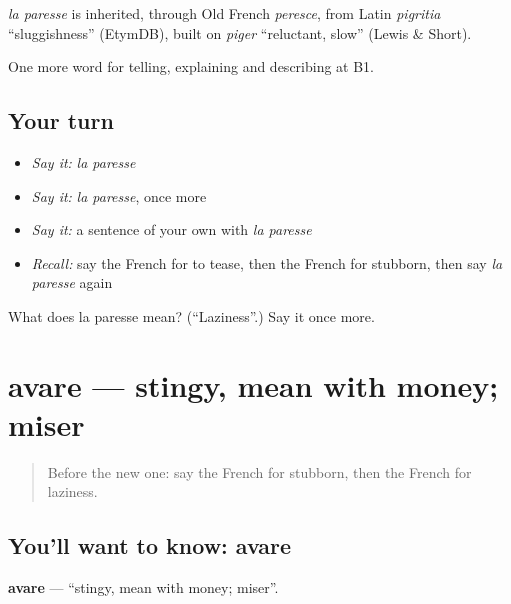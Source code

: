 \begin{cousinweb}
\emph{la paresse} is inherited, through Old French \emph{peresce}, from Latin \emph{pigritia} \textquotedblleft{}sluggishness\textquotedblright{} (EtymDB), built on \emph{piger} \textquotedblleft{}reluctant, slow\textquotedblright{} (Lewis \& Short).
\end{cousinweb}

\begin{grammarlens}[title={What you've built}]
One more word for telling, explaining and describing at B1.
\end{grammarlens}

\subsection*{Your turn}
\begin{itemize}
\raggedright
  \item \emph{Say it:} \emph{la paresse}
  \item \emph{Say it:} \emph{la paresse}, once more
  \item \emph{Say it:} a sentence of your own with \emph{la paresse}
  \item \emph{Recall:} say the French for to tease, then the French for stubborn, then say \emph{la paresse} again
\end{itemize}

\begin{tcolorbox}[breakable,colback=teal!4,colframe=teal!35!black,title={Before you move on}]
What does la paresse mean? (\textquotedblleft{}Laziness\textquotedblright{}.) Say it once more.
\end{tcolorbox}
\section[avare]{avare — stingy, mean with money; miser}

\label{lesson:FR-C467-avare}



\begin{quote}
Before the new one: say the French for stubborn, then the French for laziness.
\end{quote}

\subsection*{You'll want to know: avare}
\textbf{avare} — \textquotedblleft{}stingy, mean with money; miser\textquotedblright{}.

